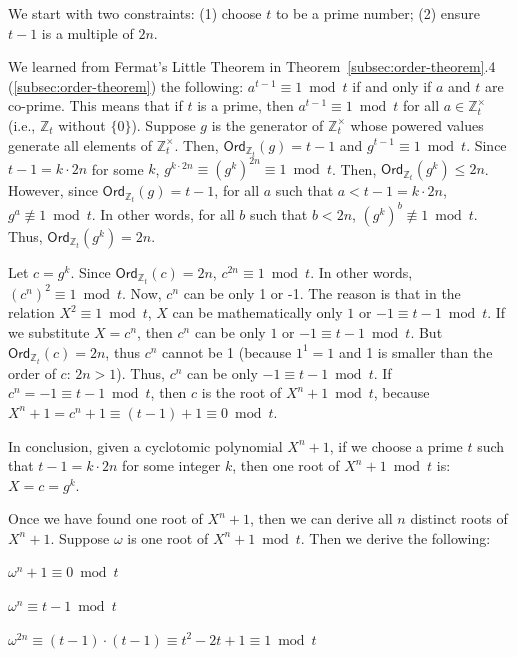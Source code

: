 We start with two constraints: (1) choose $t$ to be a prime number; (2) ensure $t-1$ is a multiple of $2n$.

We learned from Fermat's Little Theorem in Theorem~\ref*{subsec:order-theorem}.4 (\autoref{subsec:order-theorem}) the following: $a^{t - 1} \equiv 1 \bmod t$ if and only if $a$ and $t$ are co-prime. This means that if $t$ is a prime, then $a^{t - 1} \equiv 1 \bmod t$ for all $a \in \mathbb{Z}_t^{\times}$ (i.e., $\mathbb{Z}_t$ without $\{0\}$). Suppose $g$ is the generator of $\mathbb{Z}_t^{\times}$ whose powered values generate all elements of $\mathbb{Z}_t^{\times}$. Then, $\textsf{Ord}_{\mathbb{Z}_t}(g) = t - 1$ and $g^{t - 1} \equiv 1 \bmod t$. Since $t - 1 = k \cdot 2n$ for some $k$, $g^{k\cdot2n} \equiv (g^{k})^{2n} \equiv 1 \bmod t$. Then, $\textsf{Ord}_{\mathbb{Z}_t}(g^{k}) \leq 2n$. However, since $\textsf{Ord}_{\mathbb{Z}_t}(g) = t - 1$, for all $a$ such that $a < t - 1 = k \cdot 2n$, $g^a \not\equiv 1 \bmod t$. In other words, for all $b$ such that $b < 2n$, $(g^k)^b \not\equiv 1 \bmod t$. Thus, $\textsf{Ord}_{\mathbb{Z}_t}(g^{k}) = 2n$. 

Let $c = g^k$. Since $\textsf{Ord}_{\mathbb{Z}_t}(c) = 2n$, $c^{2n} \equiv 1 \bmod t$. In other words, $(c^n)^2 \equiv 1 \bmod t$. 
Now, $c^n$ can be only 1 or -1. The reason is that in the relation $X^2 \equiv 1 \bmod t$, $X$ can be mathematically only $1$ or $-1 \equiv t - 1 \bmod t$. If we substitute $X = c^n$, then $c^n$ can be only $1$ or $-1 \equiv t - 1 \bmod t$. But $\textsf{Ord}_{\mathbb{Z}_t}(c) = 2n$, thus $c^n$ cannot be 1 (because $1^1 = 1$ and 1 is smaller than the order of $c$: $2n > 1$). Thus, $c^n$ can be only $-1 \equiv t - 1 \bmod t$. If $c^n = -1 \equiv t - 1 \bmod t$, then $c$ is the root of $X^n + 1 \bmod t$, because $X^n + 1 = c^n + 1 \equiv (t - 1) + 1 \equiv 0 \bmod t$. 

In conclusion, given a cyclotomic polynomial $X^n + 1$, if we choose a prime $t$ such that $t - 1 = k \cdot 2n$ for some integer $k$, then one root of $X^n + 1 \bmod t$ is: $X = c = g^k$. 

Once we have found one root of $X^n + 1$, then we can derive all $n$ distinct roots of $X^n + 1$. Suppose $\omega$ is one root of $X^n + 1 \bmod t$. Then we derive the following:

$\omega^n + 1 \equiv 0 \bmod t$

$\omega^n \equiv t - 1 \bmod t$

$\omega^{2n} \equiv (t - 1)\cdot(t - 1) \equiv  t^2 - 2t + 1 \equiv   1 \bmod t$

